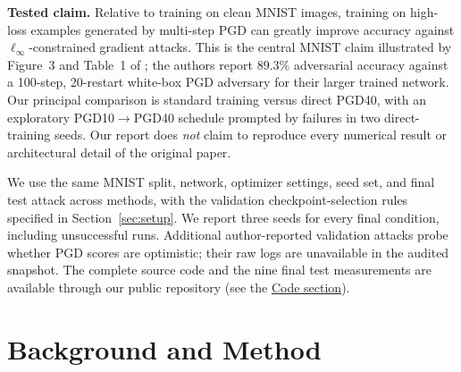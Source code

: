 \documentclass[11pt,a4paper]{article}
\newif\ifshowguides
\newcommand{\guide}[1]{%
  \ifshowguides
  \par\medskip\noindent
  \fcolorbox{guideframe}{guidebg}{%
    \begin{minipage}{\dimexpr\linewidth-2\fboxsep-2\fboxrule\relax}
      \small\textbf{Guide.}
      \begin{itemize}[leftmargin=1.2em,itemsep=1pt,topsep=2pt]
        #1
      \end{itemize}
    \end{minipage}}%
  \par\medskip
  \fi}
\newcommand{\linf}{\ell_\infty}
\begin{document}
\textbf{Tested claim.} Relative to training on clean MNIST images, training on high-loss examples generated by multi-step PGD can greatly improve accuracy against $\linf$-constrained gradient attacks. This is the central MNIST claim illustrated by Figure~3 and Table~1 of \citet{madry2018towards}; the authors report $89.3\%$ adversarial accuracy against a 100-step, 20-restart white-box PGD adversary for their larger trained network. Our principal comparison is standard training versus direct PGD40, with an exploratory PGD10$\rightarrow$PGD40 schedule prompted by failures in two direct-training seeds. Our report does \emph{not} claim to reproduce every numerical result or architectural detail of the original paper.

We use the same MNIST split, network, optimizer settings, seed set, and final test attack across methods, with the validation checkpoint-selection rules specified in Section~\ref{sec:setup}. We report three seeds for every final condition, including unsuccessful runs. Additional author-reported validation attacks probe whether PGD scores are optimistic; their raw logs are unavailable in the audited snapshot. The complete source code and the nine final test measurements are available through our public repository (see the \hyperref[sec:code]{Code section}).


\guide{
  \item Explain the problem the paper addresses and why it mattered at the time.
  \item State the claim you test in one or two precise sentences, and point to the exact figure, table or section of the paper it comes from.
  \item A testable claim names what is compared and what is expected, e.g.\ ``network A reaches lower training loss than network B at depth $L$''. ``The method works well'' is not a claim.
  \item Do not reproduce the paper's abstract.
}

\section{Background and Method}
\label{sec:method}
\end{document}
